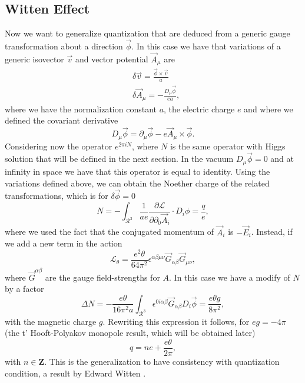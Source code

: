 \documentclass[main.tex]{subfiles}
\begin{document}
\subsection{Witten Effect}
Now we want to generalize quantization that are deduced from a generic gauge transformation about a direction $\vec\phi$. In this case we have that variations of a generic isovector $\vec v$ and vector potential $\vec A_\mu$ are
\begin{align}
&\delta\vec v=\frac{\vec\phi\times\vec v}{a}\nonumber\\
&\delta\vec A_\mu=-\frac{D_\mu\vec\phi}{ea},
\end{align}
where we have the normalization constant $a$, the electric charge $e$ and where we defined the covariant derivative
\begin{equation}
D_\mu\vec\phi=\partial_\mu\vec\phi-e\vec A_\mu\times\vec\phi.
\end{equation}
Considering now the operator $e^{2\pi i N}$, where $N$ is the same operator with Higgs solution that will be defined in the next section. In the vacuum $D_\mu\vec\phi=0$ and at infinity in space we have that this operator is equal to identity. Using the variations defined above, we can obtain the Noether charge of the related transformations, which is for $\delta\vec\phi=0$
\begin{equation}
N=-\int_{\mathcal{R}^3}\frac{1}{ae}\frac{\partial\mathcal{L}}{\partial\partial_0\vec A_i}\cdot D_i\phi=\frac{q}{e},
\end{equation}
where we used the fact that the conjugated momentum of $\vec A_i$ is $-\vec E_i$.
Instead, if we add a new term in the action
\begin{equation}
\mathcal{L}_\theta=\frac{e^2\theta}{64\pi^2}\epsilon^{\alpha\beta\mu\nu}\vec G_{\alpha\beta}\vec G_{\mu\nu},
\end{equation}
where $\vec G^{\alpha\beta}$ are the gauge field-strengths for $A$. In this case we have a modify of $N$ by a factor
\begin{equation}
\Delta N=-\frac{e\theta}{16\pi^2a}\int_{\mathcal{R}^3}\epsilon^{0i\alpha\beta}\vec G_{\alpha\beta}D_i\vec\phi=\frac{e\theta g}{8\pi^2},
\end{equation}
with the magnetic charge $g$. Rewriting this expression it follows, for $eg=-4\pi$ (the t' Hooft-Polyakov monopole result, which will be obtained later)\begin{equation}
q=ne+\frac{e\theta}{2\pi},
\end{equation}
with $n\in\mathbf{Z}$. This is the generalization to have consistency with quantization condition, a result by Edward Witten \cite{Witten}.
\end{document}
